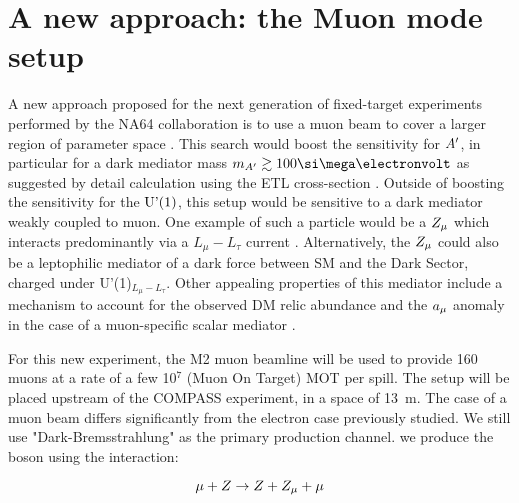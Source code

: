 \section{A new approach: the Muon mode setup}
\label{ch5:sec:muon-mode-setup}

A new approach proposed for the next generation of fixed-target experiments performed by the NA64 collaboration is to use a muon beam to cover a larger region of parameter space \cite{Gninenko:2019qiv}. This search would boost the sensitivity for $A'$, in particular for a dark mediator mass $m_{\DM} \gtrsim 100 \mev$ as suggested by detail calculation using the ETL cross-section \cite{Gninenko:2019qiv}. Outside of boosting the sensitivity for the $\textrm{U'(1)}$, this setup would be sensitive to a dark mediator weakly coupled to muon. One example of such a particle would be a $Z_{\mu}$ which interacts predominantly via a $L_{\mu} - L_{\tau}$ current \cite{krasnikov2017muon,GNINENKO2001119}. Alternatively, the $Z_{\mu}$ could also be a leptophilic mediator of a dark force between SM and the Dark Sector, charged under U'(1)$_{L_{\mu} - L_{\tau}}$. Other appealing properties of this mediator include a mechanism to account for the observed DM relic abundance \cite{GNINENKO2001119,Kirpichnikov:2020tcf,PhysRevLett.121.011102} and the $a_{\mu}$ anomaly in the case of a muon-specific scalar mediator \cite{krasnikov2017light,PhysRevD.95.115005}.

For this new experiment, the M2 muon beamline will be used to provide 160 \gev muons at a rate of a few 10$^7$ (Muon On Target) MOT per spill. The setup will be placed upstream of the COMPASS experiment, in a space of \SI{13}{\meter}. The case of a muon beam differs significantly from the electron case previously studied. We still use "Dark-Bremsstrahlung" as the primary production channel. we produce the boson using the interaction:

\begin{equation}
  \label{eq:dm-muon-int}
  \mu + Z \to Z + Z_{\mu} + \mu
\end{equation}

